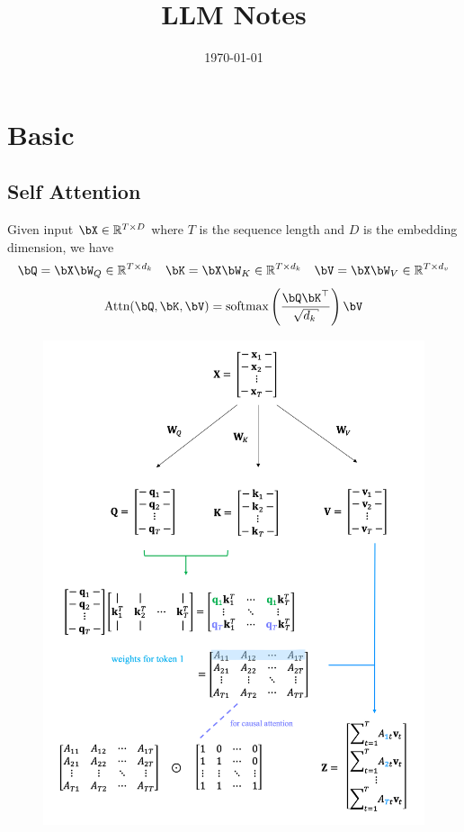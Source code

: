 \documentclass{article}
\begin{document}
\title{LLM Notes}

\date{\today}                       
\maketitle
\tableofcontents
\clearpage


\section{Basic}
\subsection{Self Attention}
Given input $\bX \in \reals^{T \times D}$ where $T$ is the sequence length and $D$ is the embedding dimension, we have
\[
\bQ = \bX \bW_Q \in \reals^{T \times d_k} \quad \bK= \bX \bW_K  \in \reals^{T \times d_k} \quad \bV = \bX \bW_V \in \reals^{T \times d_v}
\]
\[
\text{Attn}(\bQ, \bK, \bV) = \text{softmax} \left(\frac{\bQ \bK^\top}{\sqrt{d_k}} \right) \bV
\]

\begin{figure}[h]
\centering
\includegraphics[scale=0.35]{imgs/self-attention.png}
\end{figure}
\clearpage
\end{document}
